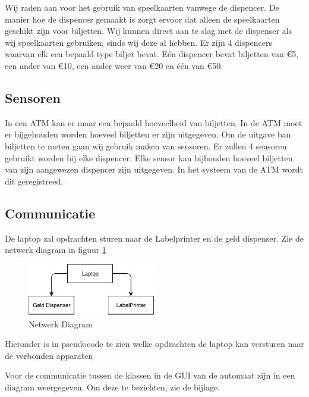 \documentclass{article}
\begin{document}
Wij raden aan voor het gebruik van speelkaarten vanwege de dispencer.
De manier hoe de dispencer gemaakt is zorgt ervoor dat alleen de speelkaarten geschikt zijn voor biljetten.
Wij kunnen direct aan te slag met de dispenser als wij speelkaarten gebruiken, sinds wij deze al hebben.
Er zijn 4 dispencers waarvan elk een bepaald type biljet bevat.
E\'en dispencer bevat biljetten van \euro{5},
een ander van \euro{10},
een ander weer van \euro{20} en \'e\'en van \euro{50}.

\newpage

\subsection{Sensoren}
In een ATM kan er maar een bepaald hoeveelheid van biljetten.
In de ATM moet er bijgehouden worden hoeveel biljetten er zijn uitgegeven.
Om de uitgave ban biljetten te meten gaan wij gebruik maken van sensoren.
Er zullen 4 sensoren gebruikt worden bij elke dispencer.
Elke sensor kan bijhouden hoeveel biljetten van zijn aangewezen dispencer zijn uitgegeven.
In het systeem van de ATM wordt dit geregistreed.


\subsection{Communicatie}

De laptop zal opdrachten sturen naar de Labelprinter en de geld dispenser.
Zie de netwerk diagram in figuur \ref{fig: Netwerk Diagram}

\begin{figure}[!h]
        \centering
        \includegraphics[height=0.9in]{netwerk_diagram.pdf}
        \caption{Netwerk Diagram}
        \label{fig: Netwerk Diagram}
\end{figure}

Hieronder is in pseudocode te zien welke opdrachten de laptop kan versturen naar de verbonden apparaten 


Voor de communicatie tussen de klassen in de GUI van de automaat zijn in een diagram weergegeven.
Om deze te bezichten, zie de bijlage.

\newpage
\end{document}
